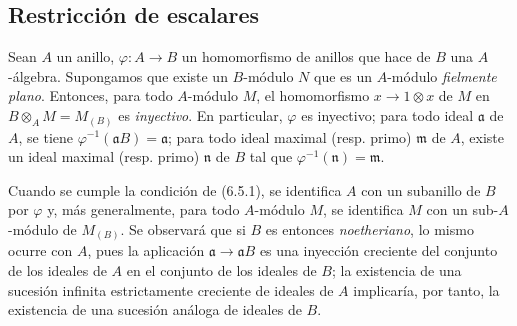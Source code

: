 \subsection{Restricción de escalares}
\label{subsection:0.6.5-fr}

\begin{env}[6.5.1]
\label{0.6.5.1-fr}
Sean $A$ un anillo, $\varphi:A\to B$ un homomorfismo de anillos que hace
de $B$ una $A$-álgebra. Supongamos que existe un $B$-módulo $N$ que es un
$A$-módulo \emph{fielmente plano}. Entonces, para todo $A$-módulo $M$,
el homomorfismo $x\to 1\otimes x$ de $M$ en
$B\otimes_A M=M_{(B)}$ es \emph{inyectivo}. En particular, $\varphi$ es
inyectivo; para todo ideal $\mathfrak{a}$ de $A$, se tiene
$\varphi^{-1}(\mathfrak{a}B)=\mathfrak{a}$; para todo ideal maximal (resp.
primo) $\mathfrak{m}$ de $A$, existe un ideal maximal (resp. primo)
$\mathfrak{n}$ de $B$ tal que $\varphi^{-1}(\mathfrak{n})=\mathfrak{m}$.
\end{env}

\begin{env}[6.5.2]
\label{0.6.5.2-fr}
Cuando se cumple la condición de (6.5.1), se identifica $A$ con un
subanillo de $B$ por $\varphi$ y, más generalmente, para todo $A$-módulo
$M$, se identifica $M$ con un sub-$A$-módulo de $M_{(B)}$. Se observará que si
$B$ es entonces \emph{noetheriano}, lo mismo ocurre con $A$, pues la aplicación
$\mathfrak{a}\to\mathfrak{a}B$ es una inyección creciente del
conjunto de los ideales de $A$ en el conjunto de los ideales de $B$;
la existencia de una sucesión infinita estrictamente creciente de ideales de $A$
implicaría, por tanto, la existencia de una sucesión análoga de ideales de $B$.
\end{env}

